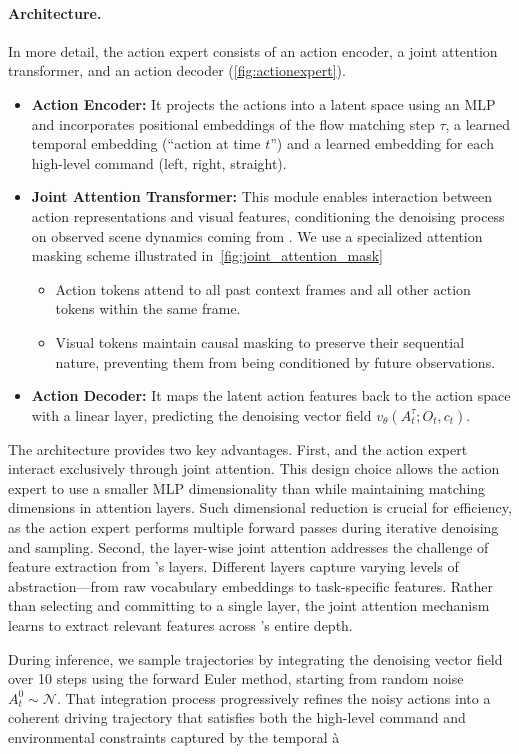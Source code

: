 \paragraph{Architecture.}
In more detail, the action expert consists of an action encoder, a joint attention transformer, and an action decoder (\autoref{fig:actionexpert}).



\begin{itemize}
    \item \textbf{Action Encoder:} It projects the actions into a latent space using an MLP and incorporates positional embeddings of the flow matching step $\tau$, a learned temporal embedding (``action at time $t$'') and a learned embedding for each high-level command (left, right, straight).
    
    \item \textbf{Joint Attention Transformer:} This module enables interaction between action representations and visual features, conditioning the denoising process on observed scene dynamics coming from \vm{}. We use a specialized attention masking scheme illustrated in~\autoref{fig:joint_attention_mask}
    \begin{itemize}
        \item Action tokens attend to all past context frames and all other action tokens within the same frame. 
        \item Visual tokens maintain causal masking to preserve their sequential nature, preventing them from being conditioned by future observations. 
    \end{itemize}
    
    \item \textbf{Action Decoder:} It maps the latent action features back to the action space with a linear layer, predicting the denoising vector field $v_\theta(A^{\tau}_t; O_t, c_t)$.
\end{itemize}



The architecture provides two key advantages. First, \vm{} and the action expert interact exclusively through joint attention. This design choice allows the action expert to use a smaller MLP dimensionality than \vm{} while maintaining matching dimensions in attention layers. Such dimensional reduction is crucial for efficiency, as the action expert performs multiple forward passes during iterative denoising and sampling. Second, the layer-wise joint attention addresses the challenge of feature extraction from \vm{}'s layers. Different layers capture varying levels of abstraction—from raw vocabulary embeddings to task-specific features. Rather than selecting and committing to a single layer, the joint attention mechanism learns to extract relevant features across \vm{}'s entire depth.

During inference, we sample trajectories by integrating the denoising vector field over 10 steps using the forward Euler method, starting from random noise $A^0_t \sim \mathcal{N}$. That integration process progressively refines the noisy actions into a coherent driving trajectory that satisfies both the high-level command and environmental constraints captured by the temporal à